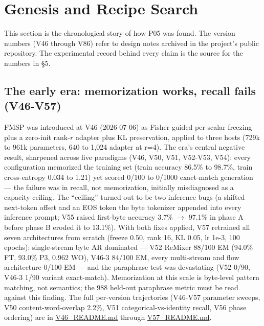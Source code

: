 \documentclass[11pt]{article}
\begin{document}
\section{Genesis and Recipe Search}

This section is the chronological story of how P05 was found. The version numbers (V46 through V86) refer to design notes archived in the project's public repository. The experimental record behind every claim is the source for the numbers in \S5.

\subsection{The early era: memorization works, recall fails (V46-V57)}

FMSP was introduced at V46 (2026-07-06) as Fisher-guided per-scalar freezing plus a zero-init rank-$r$ adapter plus KL preservation, applied to three hosts (729k to 961k parameters, 640 to 1{,}024 adapter at r=4). The era's central negative result, sharpened across five paradigms (V46, V50, V51, V52-V53, V54): every configuration memorized the training set (train accuracy 86.5\% to 98.7\%, train cross-entropy 0.034 to 1.21) yet scored 0/100 to 0/1000 exact-match generation --- the failure was in recall, not memorization, initially misdiagnosed as a capacity ceiling. The ``ceiling'' turned out to be two inference bugs (a shifted next-token offset and an EOS token the byte tokenizer appended into every inference prompt; V55 raised first-byte accuracy 3.7\% $\to$ 97.1\% in phase A before phase B eroded it to 13.1\%). With both fixes applied, V57 retrained all seven architectures from scratch (freeze 0.50, rank 16, KL 0.05, lr 1e-3, 100 epochs): single-stream byte AR dominated --- V52 ReMixer 88/100 EM (94.0\% FT, 93.0\% P3, 0.962 WO), V46-3 84/100 EM, every multi-stream and flow architecture 0/100 EM --- and the paraphrase test was devastating (V52 0/90, V46-3 1/90 variant exact-match). Memorization at this scale is byte-level pattern matching, not semantics; the 988 held-out paraphrase metric must be read against this finding. The full per-version trajectories (V46-V57 parameter sweeps, V50 content-word-overlap 2.2\%, V51 categorical-vs-identity recall, V56 phase ordering) are in \href{https://github.com/llaa33219/MicroMixer-4/blob/4bb630413dfa58ef3141291e121ab8c006d03235/V46_README.md}{V46\_README.md} through \href{https://github.com/llaa33219/MicroMixer-4/blob/4bb630413dfa58ef3141291e121ab8c006d03235/V57_README.md}{V57\_README.md}.
\end{document}
